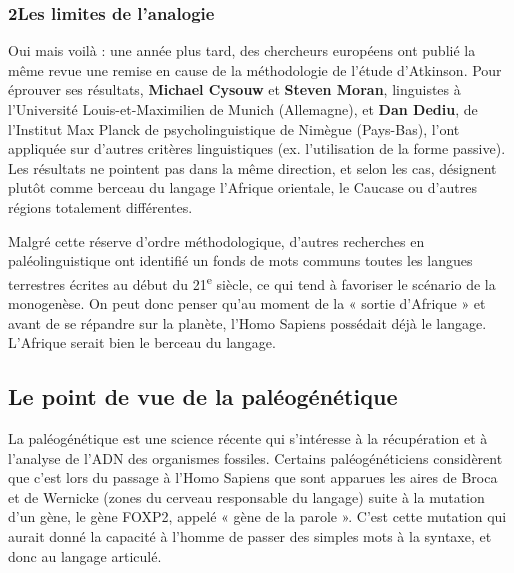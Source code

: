 \subsubsection*{2\quad Les limites de l’analogie}
Oui mais voilà : une année plus tard, des chercheurs européens ont publié la même revue une remise en cause de la méthodologie de l’étude d’Atkinson. Pour éprouver ses résultats, \textbf{Michael Cysouw} et \textbf{Steven Moran}, linguistes à l’Université Louis-et-Maximilien de Munich (Allemagne), et \textbf{Dan Dediu}, de l’Institut Max Planck de psycholinguistique de Nimègue (Pays-Bas), l’ont appliquée sur d’autres critères linguistiques (ex. l’utilisation de la forme passive). Les résultats ne pointent pas dans la même direction, et selon les cas, désignent plutôt comme berceau du langage l’Afrique orientale, le Caucase ou d’autres régions totalement différentes.

Malgré cette réserve d’ordre méthodologique, d’autres recherches en paléolinguistique ont identifié un fonds de mots communs toutes les langues terrestres écrites au début du 21\textsuperscript{e} siècle, ce qui tend à favoriser le scénario de la monogenèse. On peut donc penser qu’au moment de la « sortie d’Afrique » et avant de se répandre sur la planète, l’Homo Sapiens possédait déjà le langage. L’Afrique serait bien le berceau du langage.
\subsection{Le point de vue de la paléogénétique}
La paléogénétique est une science récente qui s’intéresse à la récupération et à l’analyse de l’ADN des organismes fossiles. Certains paléogénéticiens considèrent que c’est lors du passage à l’Homo Sapiens que sont apparues les aires de Broca et de Wernicke (zones du cerveau responsable du langage) suite à la mutation d’un gène, le gène FOXP2, appelé « gène de la parole ». C’est cette mutation qui aurait donné la capacité à l’homme de passer des simples mots à la syntaxe, et donc au langage articulé.
